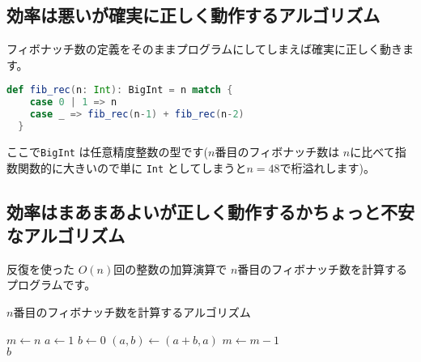 \documentclass[a4paper,twoside,onecolumn,openany,article]{memoir}
\theoremstyle{plain}
\theoremstyle{remark}
\begin{document}
\subsection{効率は悪いが確実に正しく動作するアルゴリズム}
フィボナッチ数の定義をそのままプログラムにしてしまえば確実に正しく動きます。
\begin{lstlisting}[basicstyle=\ttfamily\normalsize,showstringspaces=false,language=scala]
  def fib_rec(n: Int): BigInt = n match {
    case 0 | 1 => n
    case _ => fib_rec(n-1) + fib_rec(n-2)
  }
\end{lstlisting}
ここで\texttt{BigInt} は任意精度整数の型です($n$番目のフィボナッチ数は $n$に比べて指数関数的に大きいので単に \texttt{Int} としてしまうと$n=48$で桁溢れします)。

\subsection{効率はまあまあよいが正しく動作するかちょっと不安なアルゴリズム}
反復を使った $O(n)$回の整数の加算演算で $n$番目のフィボナッチ数を計算するプログラムです。
\begin{algorithm}[H]
\caption{$n$番目のフィボナッチ数を計算するアルゴリズム}
\begin{algorithmic}
\State $m \gets n$
\State $a \gets 1$
\State $b \gets 0$
\State $(a,b)\gets (a+b,a)$
\State $m \gets m-1$
\EndWhile\\
\Return $b$
\end{algorithmic}
\end{algorithm}
\end{document}
